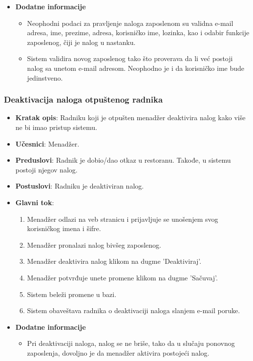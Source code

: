  \begin{itemize} 
     \item \textbf{Dodatne informacije}
 \begin{itemize}
     \item Neophodni podaci za pravljenje naloga zaposlenom su validna e-mail adresa, ime, prezime, adresa, korisničko ime, lozinka, kao i odabir funkcije zaposlenog, čiji je nalog u nastanku.
    \item Sistem validira novog zaposlenog tako što proverava da li već postoji nalog sa unetom e-mail adresom. Neophodno je i da korisničko ime bude jedinstveno.
 \end{itemize}
 \end{itemize}

 \subsubsection{Deaktivacija naloga otpuštenog radnika}
 \begin{itemize}
    \item \textbf{Kratak opis}:
   Radniku koji je otpušten menadžer deaktivira nalog kako više ne bi imao pristup sistemu.
    \item \textbf{Učesnici}:
    Menadžer.
    \item \textbf{Preduslovi}:
    Radnik je dobio/dao otkaz u restoranu. Takođe, u sistemu postoji njegov nalog.
    \item \textbf{Postuslovi}:
    Radniku je deaktiviran nalog. 
    \item \textbf{Glavni tok}:
    \begin{enumerate}
        \item Menadžer odlazi na veb stranicu i prijavljuje se unošenjem svog korisničkog imena i šifre.
        \item Menadžer pronalazi nalog bivšeg zaposlenog.
        \item Menadžer deaktivira nalog klikom na dugme 'Deaktiviraj'.
        \item Menadžer potvrđuje unete promene klikom na dugme 'Sačuvaj'.
        \item Sistem beleži promene u bazi.
        \item Sistem obaveštava radnika o deaktivaciji naloga slanjem e-mail poruke.
    \end{enumerate}
\item \textbf{Dodatne informacije}
 \begin{itemize}
     \item Pri deaktivaciji naloga, nalog se ne briše, tako da u slučaju ponovnog zaposlenja, dovoljno je da menadžer aktivira postojeći nalog.
 \end{itemize}
 \end{itemize}
\newpage
